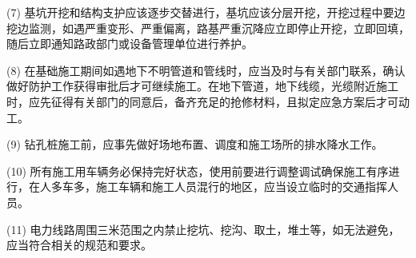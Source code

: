 (7) 基坑开挖和结构支护应该逐步交替进行，基坑应该分层开挖，开挖过程中要边挖边监测，如遇严重变形、严重偏离，路基严重沉降应立即停止开挖，立即回填，随后立即通知路政部门或设备管理单位进行养护。

(8) 在基础施工期间如遇地下不明管道和管线时，应当及时与有关部门联系，确认做好防护工作获得审批后才可继续施工。在地下管道，地下线缆，光缆附近施工时，应先征得有关部门的同意后，备齐充足的抢修材料，且拟定应急方案后才可动工。

(9) 钻孔桩施工前，应事先做好场地布置、调度和施工场所的排水降水工作。

(10) 所有施工用车辆务必保持完好状态，使用前要进行调整调试确保施工有序进行，在人多车多，施工车辆和施工人员混行的地区，应当设立临时的交通指挥人员。

(11) 电力线路周围三米范围之内禁止挖坑、挖沟、取土，堆土等，如无法避免，应当符合相关的规范和要求。


